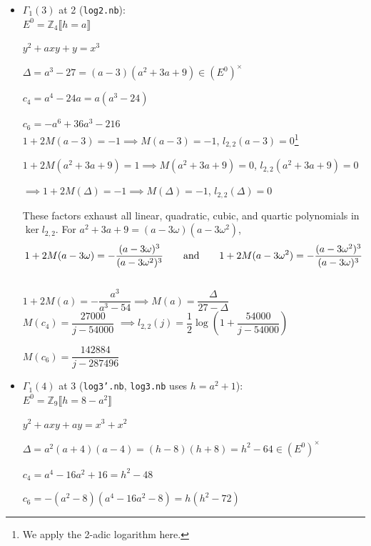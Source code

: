 \documentclass{rs}
\theoremstyle{definition}
\theoremstyle{remark}
\newcommand{\mb}[1]{\mathbb{#1}}
\newcommand{\BZ}{{\mb Z}}
\newcommand{\ad}{{\rm and}}
\renewcommand{\D}{\Delta}
\newcommand{\G}{\Gamma}
\newcommand{\lb}{\llbracket}
\newcommand{\rb}{\rrbracket}
\renewcommand{\=}{\approx}
\renewcommand{\-}{\sim}
\numberwithin{equation}{section}
\numberwithin{thm}{section}
\begin{document}
\begin{itemize}
 \item $\G_1(3)$ at 2 (\texttt{log2.nb}): \\

 $E^0 = \BZ_4 \lb h = a \rb$ 

 $y^2 + a x y + y = x^3$ 

 $\Delta = a^3 - 27 = (a - 3) (a^2 + 3 a + 9) \in (E^0)^\times$ 

 $c_4 = a^4 - 24 a = a (a^3 - 24)$ 

 $c_6 = -a^6 + 36 a^3 - 216$ \\

 $1 + 2 M(a - 3) = -1 \implies M(a - 3) = -1$, $l_{2,2}(a - 3) = 0$\footnote{We apply the 2-adic logarithm here.  } 

 $1 + 2 M(a^2 + 3 a + 9) = 1 \implies M(a^2 + 3 a + 9) = 0$, $l_{2,2}(a^2 + 3 a + 9) = 0$ 

 $\implies 1 + 2 M(\D) = -1 \implies M(\D) = -1$, $l_{2,2}(\D) = 0$ 

 These factors exhaust all linear, quadratic, cubic, and quartic polynomials in $\ker l_{2,2}$.  
 For $a^2 + 3 a + 9 = (a - 3 \omega) (a - 3 \omega^2)$, 
 \[
  1 + 2 M(a - 3 \omega) = -\frac{(a - 3 \omega)^3}{(a - 3 \omega^2)^3} \qquad \ad \qquad 1 + 2 M(a - 3 \omega^2) = -\frac{(a - 3 \omega^2)^3}{(a - 3 \omega)^3} 
 \]
 \\

 $1 + 2 M(a) = -\dfrac{a^3}{a^3 - 54} \implies M(a) = \dfrac{\D}{27 - \D}$ \\

 $M(c_4) = \dfrac{27000}{j - 54000}$ \hfill $\implies l_{2,2}(j) = \dfrac{1}{2} \log\left(1 + \dfrac{54000}{j - 54000}\right)$ 

 $M(c_6) = \dfrac{142884}{j - 287496}$ \\

 \item $\G_1(4)$ at 3 (\texttt{log3'.nb}, \texttt{log3.nb} uses $h = a^2 + 1$): \\

 $E^0 = \BZ_9 \lb h = 8 - a^2 \rb$ 

 $y^2 + a x y + a y = x^3 + x^2$ 

 $\Delta = a^2 (a + 4) (a - 4) = (h - 8) (h + 8) = h^2 - 64 \in (E^0)^\times$ 

 $c_4 = a^4 - 16 a^2 + 16 = h^2 - 48$ 

 $c_6 = -(a^2 - 8) (a^4 - 16 a^2 - 8) = h (h^2 - 72)$ \\


\end{itemize}
\end{document}
